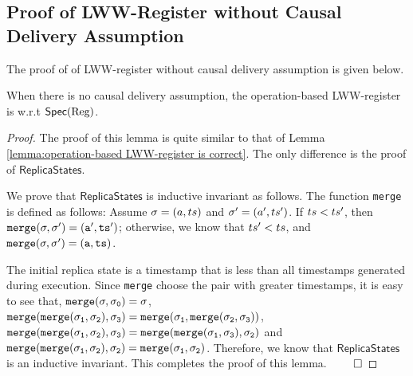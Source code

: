 



\subsection{Proof of LWW-Register without Causal Delivery Assumption}
\label{subsec:proof of LWW-register without causal delivery assumption}

The proof of \crdtlin{} of LWW-register without causal delivery assumption is given below. %

\begin{lemma}
\label{lemma:when there is no causal delivery assumption, the LWW-register is still correct}
When there is no causal delivery assumption, the operation-based LWW-register is \crdtlinearizable{} w.r.t $\mathsf{Spec}(\text{Reg})$.
\end{lemma}

\begin {proof}
The proof of this lemma is quite similar to that of Lemma \ref{lemma:operation-based LWW-register is correct}. The only difference is the proof of $\mathsf{ReplicaStates}$.

We prove that $\mathsf{ReplicaStates}$ is inductive invariant as follows. The function {\tt merge} is defined as follows: Assume $\sigma = (a,ts)$ and $\sigma' = (a',ts')$. If $ts<ts'$, then $\alabelshort[{\tt merge}]{\astate,\astate'} = (a',\ats')$; otherwise, we know that $ts'<ts$, and $\alabelshort[{\tt merge}]{\astate,\astate'} = (a,\ats)$.

The initial replica state is a timestamp that is less than all timestamps generated during execution. Since {\tt merge} choose the pair with greater timestamps, it is easy to see that, $\alabelshort[{\tt merge}]{\astate,\astate_0} = \astate$, $\alabelshort[{\tt merge}]{\alabelshort[{\tt merge}]{\astate_1,\astate_2},\astate_3} = \alabelshort[{\tt merge}]{\astate_1, \alabelshort[{\tt merge}]{\astate_2,\astate_3}}$, $\alabelshort[{\tt merge}]{\alabelshort[{\tt merge}]{\astate_1,\astate_2},\astate_3} = \alabelshort[{\tt merge}]{\alabelshort[{\tt merge}]{\astate_1,\astate_3},\astate_2}$ and $\alabelshort[{\tt merge}]{\alabelshort[{\tt merge}]{\astate_1,\astate_2},\astate_2} = \alabelshort[{\tt merge}]{\astate_1,\astate_2}$. Therefore, we know that $\mathsf{ReplicaStates}$ is an inductive invariant. This completes the proof of this lemma. $\qed$

\end {proof}




